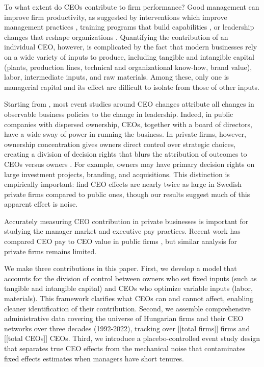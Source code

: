 \documentclass[11pt,a4paper]{article}
\begin{document}
To what extent do CEOs contribute to firm performance? Good management can improve firm productivity, as suggested by interventions which improve management practices \citep{bloom2013does}, training programs that build capabilities \citep{mckenzie2021small}, or leadership changes that reshape organizations \citep{Bertrand2003-io,bennedsen2020ceos,metcalfe2023managers}. Quantifying the contribution of an individual CEO, however, is complicated by the fact that modern businesses rely on a wide variety of inputs to produce, including tangible and intangible capital (plants, production lines, technical and organizational know-how, brand value), labor, intermediate inputs, and raw materials. Among these, only one is managerial capital and its effect are difficult to isolate from those of other inputs.

Starting from \citet{Bertrand2003-io}, most event studies around CEO changes attribute all changes in observable business policies to the change in leadership. Indeed, in public companies with dispersed ownership, CEOs, together with a board of directors, have a wide sway of power in running the business. In private firms, however, ownership concentration gives owners direct control over strategic choices, creating a division of decision rights that blurs the attribution of outcomes to CEOs versus owners \citep{fama1983separation, jensen1976theory, burkart2003family}. For example, owners may have primary decision rights on large investment projects, branding, and acquisitions. This distinction is empirically important: \citet{quigley2022ceo} find CEO effects are nearly twice as large in Swedish private firms compared to public ones, though our results suggest much of this apparent effect is noise.

Accurately measuring CEO contribution in private businesses is important for studying the manager market and executive pay practices. Recent work has compared CEO pay to CEO value in public firms \citep{tervio2008difference,gabaix2008ceo}, but similar analysis for private firms remains limited.

We make three contributions in this paper. First, we develop a model that accounts for the division of control between owners who set fixed inputs (such as tangible and intangible capital) and CEOs who optimize variable inputs (labor, materials). This framework clarifies what CEOs can and cannot affect, enabling cleaner identification of their contribution. Second, we assemble comprehensive administrative data covering the universe of Hungarian firms and their CEO networks over three decades (1992-2022), tracking over [[total firms]] firms and [[total CEOs]] CEOs. Third, we introduce a placebo-controlled event study design that separates true CEO effects from the mechanical noise that contaminates fixed effects estimates when managers have short tenures.
\end{document}
